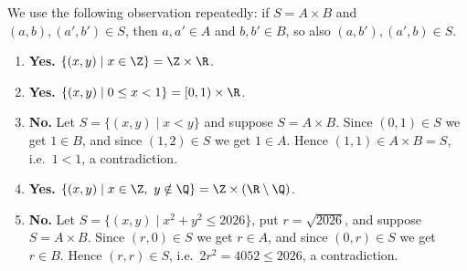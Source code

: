 
We use the following observation repeatedly: if $S=A\times B$ and $(a,b),(a',b')\in S$, then
$a,a'\in A$ and $b,b'\in B$, so also $(a,b'),(a',b)\in S$.

\begin{enumerate}[label=(\roman*)]
  \item \textbf{Yes.} $\{(x,y)\mid x\in\Z\}=\Z\times\R$.
  \item \textbf{Yes.} $\{(x,y)\mid 0\le x<1\}=[0,1)\times\R$.
  \item \textbf{No.} Let $S=\{(x,y)\mid x<y\}$ and suppose $S=A\times B$. Since $(0,1)\in S$ we
        get $1\in B$, and since $(1,2)\in S$ we get $1\in A$. Hence $(1,1)\in A\times B=S$,
        i.e.\ $1<1$, a contradiction.
  \item \textbf{Yes.} $\{(x,y)\mid x\in\Z,\ y\notin\Q\}=\Z\times(\R\setminus\Q)$.
  \item \textbf{No.} Let $S=\{(x,y)\mid x^2+y^2\le 2026\}$, put $r=\sqrt{2026}$, and suppose
        $S=A\times B$. Since $(r,0)\in S$ we get $r\in A$, and since $(0,r)\in S$ we get
        $r\in B$. Hence $(r,r)\in S$, i.e.\ $2r^2=4052\le 2026$, a contradiction.
\end{enumerate}
